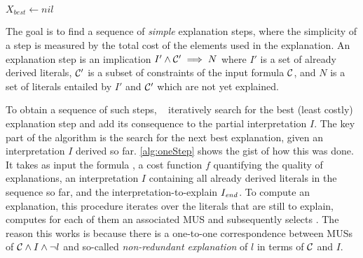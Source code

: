 \newcommand\onestep{\ensuremath{\call{explain-One-Step}}\xspace}

\begin{algorithm}[t]
  \caption{$\onestep(\formulac,f,I,\Iend)$}
  \label{alg:oneStep}
$X_{best} \gets \mathit{nil}$\;
\end{algorithm}


The goal is to find a sequence of \textit{simple} explanation steps, where the simplicity of a step is measured by the total cost of the elements used in the explanation.
An explanation step is an implication $I' \wedge \mathcal{C} ' \implies N$ where $I'$ is a set of already derived literals, $\mathcal{C} '$ is a subset of constraints of the input formula $\mathcal{C} $, and $N$ is a set of literals entailed by $I'$ and $\mathcal{C} '$ which are not yet explained.

To obtain a sequence of such steps, ~\citet{ecai/BogaertsGCG20} iteratively search for the best (least costly) explanation step and add its consequence to the partial interpretation $I$.
%
The key part of the algorithm is the search for the next best explanation, given an interpretation $I$ derived so far. 
\cref{alg:oneStep} shows the gist of how this was done.
It takes as input the formula \formulac, a cost function $f$ quantifying the quality of explanations, an interpretation $I$ containing all already derived literals in the sequence so far, and the interpretation-to-explain $I_\mathit{end} $. 
To compute an explanation, this procedure iterates over the literals that are still to explain, computes for each of them an associated MUS and subsequently selects .  
The reason this works is because there is a one-to-one correspondence between MUSs of $\mathcal{C}  \land I \land \neg l$ and so-called \emph{non-redundant explanation} of $l$ in terms of $\mathcal{C} $ and $I$. %

